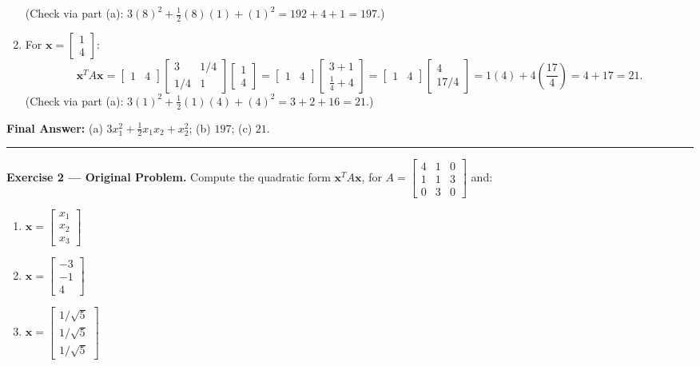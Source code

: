 \documentclass[11pt, letterpaper]{article}
\theoremstyle{definition}
\theoremstyle{remark}
\begin{document}
\begin{enumerate}[label=\alph*.]
\[    \]
    (Check via part (a): $3(8)^2 + \frac{1}{2}(8)(1) + (1)^2 = 192 + 4 + 1 = 197$.)
    \item For $\mathbf{x} = \begin{bmatrix} 1 \\ 4 \end{bmatrix}$:
    \[
    \mathbf{x}^T A \mathbf{x} = \begin{bmatrix} 1 & 4 \end{bmatrix} \begin{bmatrix} 3 & 1/4 \\ 1/4 & 1 \end{bmatrix} \begin{bmatrix} 1 \\ 4 \end{bmatrix} = \begin{bmatrix} 1 & 4 \end{bmatrix} \begin{bmatrix} 3 + 1 \\[4pt] \frac{1}{4} + 4 \end{bmatrix} = \begin{bmatrix} 1 & 4 \end{bmatrix} \begin{bmatrix} 4 \\ 17/4 \end{bmatrix} = 1(4) + 4\left(\frac{17}{4}\right) = 4 + 17 = 21.
    \]
    (Check via part (a): $3(1)^2 + \frac{1}{2}(1)(4) + (4)^2 = 3 + 2 + 16 = 21$.)
\end{enumerate}

\textbf{Final Answer:} (a) $3x_1^2 + \frac{1}{2}x_1x_2 + x_2^2$; \quad (b) $197$; \quad (c) $21$.

\medskip
\hrule
\medskip

\textbf{Exercise 2 --- Original Problem.} Compute the quadratic form $\mathbf{x}^T A \mathbf{x}$, for $A = \begin{bmatrix} 4 & 1 & 0 \\ 1 & 1 & 3 \\ 0 & 3 & 0 \end{bmatrix}$ and:
\begin{enumerate}[label=\alph*.]
    \item $\mathbf{x} = \begin{bmatrix} x_1 \\ x_2 \\ x_3 \end{bmatrix}$
    \item $\mathbf{x} = \begin{bmatrix} -3 \\ -1 \\ 4 \end{bmatrix}$
    \item $\mathbf{x} = \begin{bmatrix} 1/\sqrt{5} \\ 1/\sqrt{5} \\ 1/\sqrt{5} \end{bmatrix}$
\end{enumerate}
\end{document}
